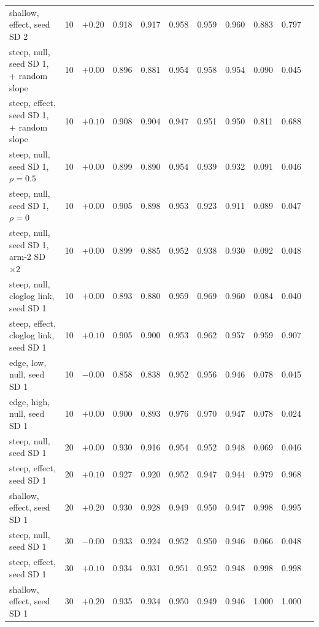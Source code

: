 \begin{table}[H]
\begin{tabular}{@{}lcccccccccc@{}}
shallow, effect, seed SD 2 & 10 & $+0.20$ & 0.918 & 0.917 & 0.958 & 0.959 & 0.960 & 0.883 & 0.797 \\
steep, null, seed SD 1, + random slope & 10 & $+0.00$ & 0.896 & 0.881 & 0.954 & 0.958 & 0.954 & 0.090 & 0.045 \\
steep, effect, seed SD 1, + random slope & 10 & $+0.10$ & 0.908 & 0.904 & 0.947 & 0.951 & 0.950 & 0.811 & 0.688 \\
steep, null, seed SD 1, $\rho=0.5$ & 10 & $+0.00$ & 0.899 & 0.890 & 0.954 & 0.939 & 0.932 & 0.091 & 0.046 \\
steep, null, seed SD 1, $\rho=0$ & 10 & $+0.00$ & 0.905 & 0.898 & 0.953 & 0.923 & 0.911 & 0.089 & 0.047 \\
steep, null, seed SD 1, arm-2 SD $\times2$ & 10 & $+0.00$ & 0.899 & 0.885 & 0.952 & 0.938 & 0.930 & 0.092 & 0.048 \\
steep, null, cloglog link, seed SD 1 & 10 & $+0.00$ & 0.893 & 0.880 & 0.959 & 0.969 & 0.960 & 0.084 & 0.040 \\
steep, effect, cloglog link, seed SD 1 & 10 & $+0.10$ & 0.905 & 0.900 & 0.953 & 0.962 & 0.957 & 0.959 & 0.907 \\
edge, low, null, seed SD 1 & 10 & $-0.00$ & 0.858 & 0.838 & 0.952 & 0.956 & 0.946 & 0.078 & 0.045 \\
edge, high, null, seed SD 1 & 10 & $+0.00$ & 0.900 & 0.893 & 0.976 & 0.970 & 0.947 & 0.078 & 0.024 \\
steep, null, seed SD 1 & 20 & $+0.00$ & 0.930 & 0.916 & 0.954 & 0.952 & 0.948 & 0.069 & 0.046 \\
steep, effect, seed SD 1 & 20 & $+0.10$ & 0.927 & 0.920 & 0.952 & 0.947 & 0.944 & 0.979 & 0.968 \\
shallow, effect, seed SD 1 & 20 & $+0.20$ & 0.930 & 0.928 & 0.949 & 0.950 & 0.947 & 0.998 & 0.995 \\
steep, null, seed SD 1 & 30 & $-0.00$ & 0.933 & 0.924 & 0.952 & 0.950 & 0.946 & 0.066 & 0.048 \\
steep, effect, seed SD 1 & 30 & $+0.10$ & 0.934 & 0.931 & 0.951 & 0.952 & 0.948 & 0.998 & 0.998 \\
shallow, effect, seed SD 1 & 30 & $+0.20$ & 0.935 & 0.934 & 0.950 & 0.949 & 0.946 & 1.000 & 1.000 \\
\bottomrule
\end{tabular}
\end{table}
